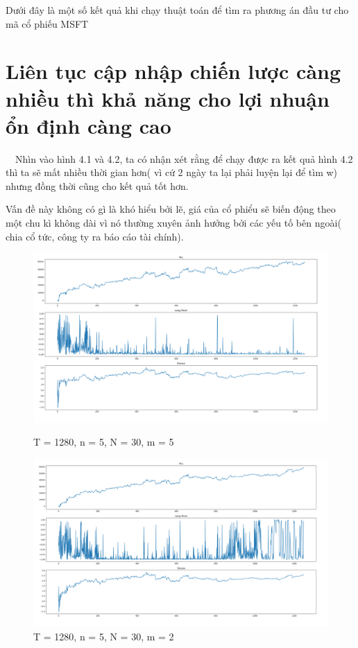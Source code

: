 \documentclass[14pt]{extreport}
\begin{document}
Dưới đây là một số kết quả khi chạy thuật toán để tìm ra phương án đầu tư cho mã cổ phiếu MSFT

\section{Liên tục cập nhập chiến lược càng nhiều thì khả năng cho lợi nhuận ổn định càng cao}

$\quad$Nhìn vào hình 4.1 và 4.2, ta có nhận xét rằng để chạy được ra kết quả hình 4.2 thì ta sẽ mất nhiều thời gian hơn( vì cứ 2 ngày ta lại phải luyện lại để tìm w) nhưng đồng thời cũng cho kết quả tốt hơn.

Vấn đề này không có gì là khó hiểu bởi lẽ, giá của cổ phiểu sẽ biến động theo một chu kì không dài vì nó thường xuyên ảnh hưởng bởi các yếu tố bên ngoài( chia cổ tức, công ty ra báo cáo tài chính).
\begin{center}
    \begin{figure}[htp]
    \begin{center}
     \includegraphics[scale=.4]{result_1-1}
    \end{center}
    \caption{T = 1280, n = 5, N = 30, m = 5}
    \begin{center}
     \includegraphics[scale=.4]{result_1-2}
    \end{center}
    \caption{T = 1280, n = 5, N = 30, m = 2}
    \end{figure}
\end{center} 
\end{document}
